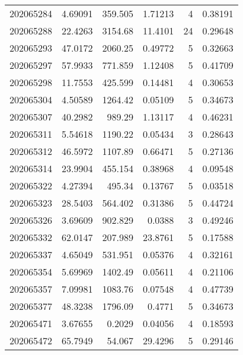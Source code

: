 \begin{tabular}{rrrrrr}
 202065284 &          4.69091 &      359.505  &            1.71213 &           4 & 0.38191 \\
 202065288 &         22.4263  &     3154.68   &           11.4101  &          24 & 0.29648 \\
 202065293 &         47.0172  &     2060.25   &            0.49772 &           5 & 0.32663 \\
 202065297 &         57.9933  &      771.859  &            1.12408 &           5 & 0.41709 \\
 202065298 &         11.7553  &      425.599  &            0.14481 &           4 & 0.30653 \\
 202065304 &          4.50589 &     1264.42   &            0.05109 &           5 & 0.34673 \\
 202065307 &         40.2982  &      989.29   &            1.13117 &           4 & 0.46231 \\
 202065311 &          5.54618 &     1190.22   &            0.05434 &           3 & 0.28643 \\
 202065312 &         46.5972  &     1107.89   &            0.66471 &           5 & 0.27136 \\
 202065314 &         23.9904  &      455.154  &            0.38968 &           4 & 0.09548 \\
 202065322 &          4.27394 &      495.34   &            0.13767 &           5 & 0.03518 \\
 202065323 &         28.5403  &      564.402  &            0.31386 &           5 & 0.44724 \\
 202065326 &          3.69609 &      902.829  &            0.0388  &           3 & 0.49246 \\
 202065332 &         62.0147  &      207.989  &           23.8761  &           5 & 0.17588 \\
 202065337 &          4.65049 &      531.951  &            0.05376 &           4 & 0.32161 \\
 202065354 &          5.69969 &     1402.49   &            0.05611 &           4 & 0.21106 \\
 202065357 &          7.09981 &     1083.76   &            0.07548 &           4 & 0.47739 \\
 202065377 &         48.3238  &     1796.09   &            0.4771  &           5 & 0.34673 \\
 202065471 &          3.67655 &        0.2029 &            0.04056 &           4 & 0.18593 \\
 202065472 &         65.7949  &       54.067  &           29.4296  &           5 & 0.29146 \\

\end{tabular}
